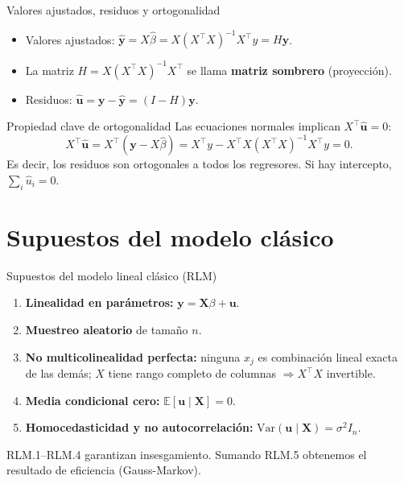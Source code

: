 \documentclass{beamer}
\begin{document}
\begin{frame}{Valores ajustados, residuos y ortogonalidad}

\begin{itemize}
    \item Valores ajustados: $\hat{\mathbf{y}} = X\hat{\beta} = X(X^{\top}X)^{-1}X^{\top}y = H\mathbf{y}$.
    \item La matriz $H = X(X^{\top}X)^{-1}X^{\top}$ se llama \textbf{matriz sombrero} (proyección).
    \item Residuos: $\hat{\mathbf{u}} = \mathbf{y} - \hat{\mathbf{y}} = (I-H)\mathbf{y}$.
\end{itemize}

\pause

\begin{block}{Propiedad clave de ortogonalidad}
Las ecuaciones normales implican $X^{\top}\hat{\mathbf{u}} = 0$:
\[
X^{\top}\hat{\mathbf{u}} = X^{\top}(\mathbf{y}-X\hat{\beta}) = X^{\top}y - X^{\top}X(X^{\top}X)^{-1}X^{\top}y = 0.
\]
Es decir, los residuos son ortogonales a todos los regresores. Si hay intercepto, $\sum_i \hat{u}_i = 0$.
\end{block}

\end{frame}

\section{Supuestos del modelo clásico}

\begin{frame}{Supuestos del modelo lineal clásico (RLM)}
\begin{enumerate}
    \item[RLM.1] \textbf{Linealidad en parámetros:} $\mathbf{y} = \mathbf{X}\beta + \mathbf{u}$.
    \pause
    \item[RLM.2] \textbf{Muestreo aleatorio} de tamaño $n$.
    \pause
    \item[RLM.3] \textbf{No multicolinealidad perfecta:} ninguna $x_j$ es combinación lineal exacta de las demás; $X$ tiene rango completo de columnas $\Rightarrow X^{\top}X$ invertible.
    \pause
    \item[RLM.4] \textbf{Media condicional cero:} $\mathbb{E}[\mathbf{u}\mid \mathbf{X}] = 0$.
    \pause
    \item[RLM.5] \textbf{Homocedasticidad y no autocorrelación:} $\text{Var}(\mathbf{u}\mid \mathbf{X}) = \sigma^2 I_n$.
\end{enumerate}

\medskip
RLM.1--RLM.4 garantizan \alert{insesgamiento}. Sumando RLM.5 obtenemos el resultado de eficiencia (Gauss-Markov).
\end{frame}
\end{document}

